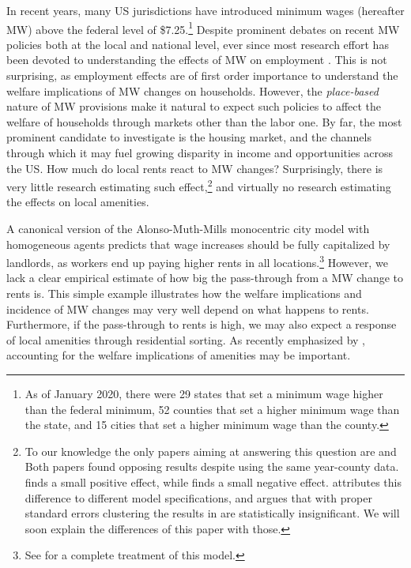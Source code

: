 
In recent years, many US jurisdictions have introduced minimum wages (hereafter MW) above the 
federal level of \$7.25.\footnote{As of January 2020, there were 29 states that set a minimum 
	wage higher than the federal minimum, 52 counties that set a higher minimum wage than the 
	state, and 15 cities that set a higher minimum wage than the county.}
Despite prominent debates on recent MW policies both at the local and national level, ever since 
\textcite{card2000minimum} most research effort has been devoted to understanding the effects of MW on employment \parencite{neumark2006minimum, dube2010minimum, dube2016minimum}. This is not surprising, 
as employment effects are of first order importance to understand the welfare implications of MW 
changes on households. However, the \textit{place-based} nature of MW provisions make it natural to 
expect such policies to affect the welfare of households through markets other than the labor one. 
By far, the most prominent candidate to investigate is the housing market, and the channels through 
which it may fuel growing disparity in income and opportunities across the US. How much do local rents 
react to MW changes? Surprisingly, there is very little research estimating such effect,\footnote{To 
	our knowledge the only papers aiming at answering this question are 
	\textcite{yamagishi2019minimum} and \textcite{tidemann2018mw} Both papers found opposing results despite using the same year-county data. \textcite{yamagishi2019minimum} finds a small positive effect, while \textcite{tidemann2018mw} finds a small negative effect. \textcite{yamagishi2019minimum} 
	attributes this difference to different model specifications, and argues that with proper standard 
	errors clustering the results in \textcite{tidemann2018mw} are statistically insignificant. We 
	will soon explain the differences of this paper with those.} 
and virtually no research estimating the effects on local amenities.

A canonical version of the Alonso-Muth-Mills monocentric city  model with homogeneous agents 
predicts that wage increases should be fully capitalized by landlords, as workers end up paying 
higher rents in all locations.\footnote{See \textcite{brueckner1987structure} for a complete treatment 
	of this model.} 
However, we lack a clear empirical estimate of how big the pass-through from a MW change to 
rents is. This simple example illustrates how the welfare implications and incidence of MW changes
may very well depend on what happens to rents. Furthermore, if the pass-through to rents is high, 
we may also expect a response of local amenities through residential sorting. As recently emphasized
by \textcite{diamond2016determinants}, accounting for the welfare implications of amenities may be 
important.
 
